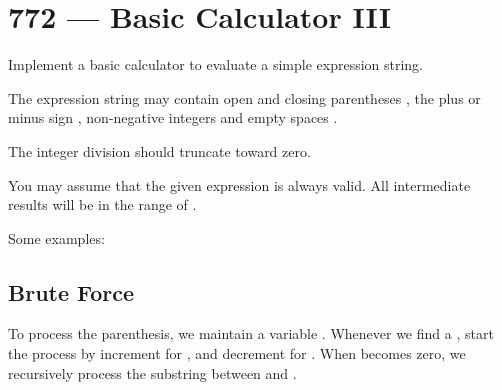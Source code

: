 \section{772 --- Basic Calculator III}
Implement a basic calculator to evaluate a simple expression string.

The expression string may contain open \fcj{(} and closing parentheses \fcj{)}, the plus \fcj{+} or minus sign \fcj{-}, non-negative integers and empty spaces .

The integer division should truncate toward zero.

You may assume that the given expression is always valid. All intermediate results will be in the range of \fcj{[-2147483648, 2147483647]}.

Some examples:





\subsection{Brute Force}
To process the parenthesis, we maintain a variable . Whenever we find a , start the process by increment  for , and decrement for . When  becomes zero, we recursively process the substring between  and .

